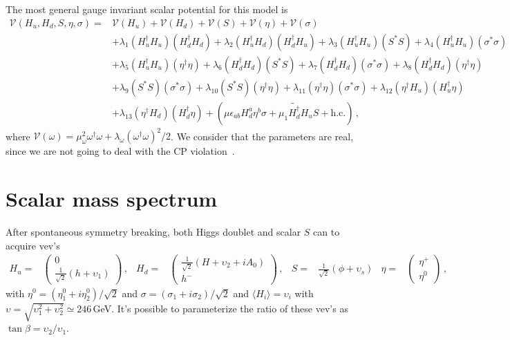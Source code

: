 \documentclass[12pt]{article}
\begin{document}
The most general gauge invariant scalar potential for this model is
%
\begin{align*}
    \mathcal{V}(H_{u}, H_{d}, S, \eta, \sigma) = & \mathcal{V}(H_{u}) + \mathcal{V}(H_{d}) + \mathcal{V}(S) + \mathcal{V}(\eta) + \mathcal{V}(\sigma) \\
    &+ \lambda_{1} (H^{\dagger}_{u} H_{u}) (H^{\dagger}_{d} H_{d}) + \lambda_{2} (H^{\dagger}_{u} H_{d}) (H^{\dagger}_{d} H_{u}) + \lambda_{3} (H_{u}^{\dagger} H_{u} ) (S^{*} S) + \lambda_{4} (H_{u}^{\dagger} H_{u} ) (\sigma^{*} \sigma ) \\
    &+ \lambda_{5} (H_{u}^{\dagger} H_{u} ) (\eta^{\dagger} \eta ) + \lambda_{6} (H_{d}^{\dagger} H_{d} ) (S^{*} S) + \lambda_{7} (H_{d}^{\dagger} H_{d} ) (\sigma^{*} \sigma ) + \lambda_{8} (H_{d}^{\dagger} H_{d} ) (\eta^{\dagger} \eta )  \\
    &+ \lambda_{9} (S^{*} S) (\sigma^{*} \sigma ) + \lambda_{10} (S^{*} S) (\eta^{\dagger} \eta ) + \lambda_{11} (\eta^{\dagger} \eta ) (\sigma^{*} \sigma ) + \lambda_{12} (\eta^{\dagger} H_{u} ) (H^{\dagger}_{u} \eta ) \\
    &+ \lambda_{13} (\eta^{\dagger} H_{d} ) (H^{\dagger}_{d} \eta ) + (\mu \epsilon_{a b} H_{d}^{a} \eta^{b} \sigma + \mu_{1} \widetilde{H^{\dagger}_{d}} H_{u} S + \text{h.c.})\,,
\end{align*}
%
where $\mathcal{V}(\omega) = \mu^{2}_{\omega} \omega^{\dagger} \omega + \lambda_{\omega} (\omega^{\dagger} \omega)^{2}/2$. We consider that the parameters are real, since we are not going to deal with the CP violation~\cite{Abe:2016sqa}.

\section{Scalar mass spectrum}
\label{sec:ScaMassSpect}

 After spontaneous symmetry breaking, both Higgs doublet and scalar $S$ can to acquire vev's
%
\begin{align*}
    H_{u} =& \begin{pmatrix}0 \\ \frac{1}{\sqrt{2}} (h+\upsilon_{1}) \end{pmatrix} \,,
    &H_{d} =& \begin{pmatrix}\frac{1}{\sqrt{2}} (H+\upsilon_{2}+iA_{0}) \\ h^{-} \end{pmatrix} \,, &S =& \frac{1}{\sqrt{2}} (\phi+\upsilon_{s})
    &\eta =& \begin{pmatrix}\eta^{+} \\ \eta^{0} \end{pmatrix} \,,
\end{align*}
%
with $\eta^{0} = (\eta_{1}^{0}+i \eta_{2}^{0})/\sqrt{2}$ and $\sigma = ({\sigma}_{1}+i {\sigma}_{2})/\sqrt{2}$ and $\langle  H_{i} \rangle = \upsilon_{i}$ with $\upsilon=\sqrt{\upsilon_{1}^2+\upsilon_{2}^2} \simeq 246$\,GeV. It's possible to parameterize the ratio of these vev's as $\tan \beta = \upsilon_{2}/\upsilon_{1}$.
\end{document}
